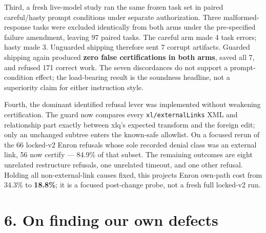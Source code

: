 \documentclass[
  11pt,
]{article}
\begin{document}
Third, a fresh live-model study ran the same frozen task set in paired
careful/hasty prompt conditions under separate authorization. Three
malformed-response tasks were excluded identically from both arms under
the pre-specified failure amendment, leaving 97 paired tasks. The
careful arm made 4 task errors; hasty made 3. Unguarded shipping
therefore sent 7 corrupt artifacts. Guarded shipping again produced
\textbf{zero false certifications in both arms}, saved all 7, and
refused 171 correct work. The seven discordances do not support a
prompt-condition effect; the load-bearing result is the soundness
headline, not a superiority claim for either instruction style.

Fourth, the dominant identified refusal lever was implemented without
weakening certification. The guard now compares every
\texttt{xl/externalLinks} XML and relationship part exactly between
xlq's expected transform and the foreign edit; only an unchanged subtree
enters the known-safe allowlist. On a focused rerun of the 66 locked-v2
Enron refusals whose sole recorded denial class was an external link, 56
now certify --- 84.9\% of that subset. The remaining outcomes are eight
unrelated restructure refusals, one unrelated timeout, and one other
refusal. Holding all non-external-link causes fixed, this projects Enron
own-path cost from 34.3\% to \textbf{18.8\%}; it is a focused
post-change probe, not a fresh full locked-v2 run.

\section{6. On finding our own
defects}\label{on-finding-our-own-defects}
\end{document}
